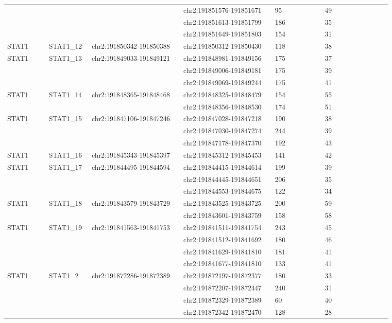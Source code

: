 \begin{landscape}
\begin{longtable}{p{0.1\linewidth}|p{0.1\linewidth}p{0.22\linewidth}p{0.22\linewidth}p{0.12\linewidth}p{0.16\linewidth}}
\\
 & & & chr2:191851576-191851671 & 95 & 49
\\
 & & & chr2:191851613-191851799 & 186 & 35
\\
 & & & chr2:191851649-191851803 & 154 & 31
\\
STAT1 & STAT1\_12 & chr2:191850342-191850388 & chr2:191850312-191850430 & 118 & 38
\\
STAT1 & STAT1\_13 & chr2:191849033-191849121 & chr2:191848981-191849156 & 175 & 37
\\
 & & & chr2:191849006-191849181 & 175 & 39
\\
 & & & chr2:191849069-191849244 & 175 & 41
\\
STAT1 & STAT1\_14 & chr2:191848365-191848468 & chr2:191848325-191848479 & 154 & 55
\\
 & & & chr2:191848356-191848530 & 174 & 51
\\
STAT1 & STAT1\_15 & chr2:191847106-191847246 & chr2:191847028-191847218 & 190 & 38
\\
 & & & chr2:191847030-191847274 & 244 & 39
\\
 & & & chr2:191847178-191847370 & 192 & 43
\\
STAT1 & STAT1\_16 & chr2:191845343-191845397 & chr2:191845312-191845453 & 141 & 42
\\
STAT1 & STAT1\_17 & chr2:191844495-191844594 & chr2:191844415-191844614 & 199 & 39
\\
 & & & chr2:191844445-191844651 & 206 & 35
\\
 & & & chr2:191844553-191844675 & 122 & 34
\\
STAT1 & STAT1\_18 & chr2:191843579-191843729 & chr2:191843525-191843725 & 200 & 59
\\
 & & & chr2:191843601-191843759 & 158 & 58
\\
STAT1 & STAT1\_19 & chr2:191841563-191841753 & chr2:191841511-191841754 & 243 & 45
\\
 & & & chr2:191841512-191841692 & 180 & 46
\\
 & & & chr2:191841629-191841810 & 181 & 41
\\
 & & & chr2:191841677-191841810 & 133 & 41
\\
STAT1 & STAT1\_2 & chr2:191872286-191872389 & chr2:191872197-191872377 & 180 & 33
\\
 & & & chr2:191872207-191872447 & 240 & 31
\\
 & & & chr2:191872329-191872389 & 60 & 40
\\
 & & & chr2:191872342-191872470 & 128 & 28
\\

\end{longtable}
\end{landscape}
